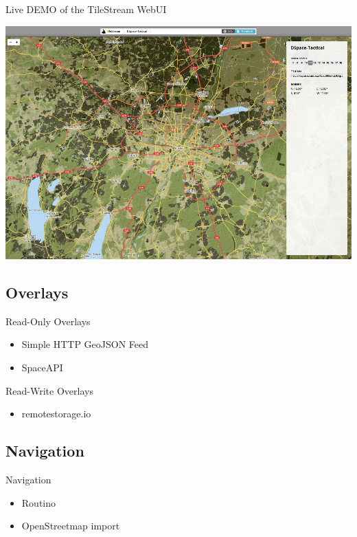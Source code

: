 \documentclass{beamer}
\begin{document}
\begin{frame}{Live DEMO of the TileStream WebUI}
 \begin{center}
  \includegraphics[scale=0.3]{images/tilestream_ui}
 \end{center}
\end{frame}

\subsection{Overlays}

\begin{frame}{Read-Only Overlays}
 \begin{itemize}
  \item Simple HTTP GeoJSON Feed
  \item SpaceAPI
 \end{itemize}
\end{frame}


\begin{frame}{Read-Write Overlays}
 \begin{itemize}
  \item remotestorage.io
 \end{itemize}
\end{frame}


\subsection{Navigation}

\begin{frame}{Navigation}
 \begin{itemize}
  \item Routino
  \item OpenStreetmap import
 \end{itemize}
\end{frame}
\end{document}
